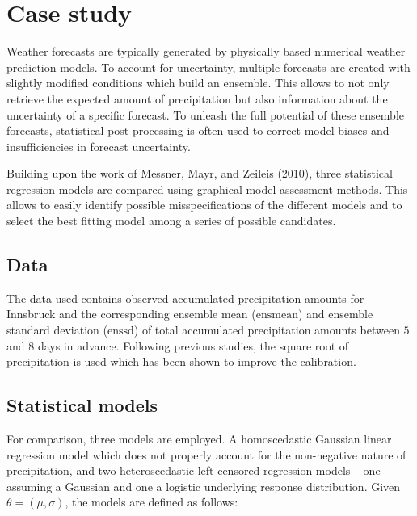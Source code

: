 \documentclass[twoside]{report}
\begin{document}

\maketitle



\section{Case study}

Weather forecasts are typically generated by physically based numerical weather
prediction models. To account for uncertainty, multiple forecasts are created
with slightly modified conditions which build an ensemble.
This allows to not only retrieve the expected amount of precipitation
but also information about the uncertainty of a specific forecast.
To unleash the full potential of these ensemble forecasts, statistical
post-processing is often used to correct model biases and insufficiencies in
forecast uncertainty.

Building upon the work of Messner, Mayr, and Zeileis (2010), three statistical
regression models are compared using graphical model assessment methods.
This allows to easily identify possible misspecifications of the different
models and to select the best fitting model among a series of possible candidates.

\subsection{Data}

The data used contains observed accumulated precipitation amounts for
Innsbruck and the corresponding ensemble mean ($\text{ensmean}$) and
ensemble standard deviation ($\text{enssd}$) of total accumulated precipitation amounts
between $5$ and $8$ days in advance.
Following previous studies, the square root of precipitation is used which has
been shown to improve the calibration.

\subsection{Statistical models}

For comparison, three models are employed. A homoscedastic Gaussian linear regression
model which does not properly account for the non-negative nature of precipitation,
and two heteroscedastic left-censored regression models --
one assuming a Gaussian and one a logistic underlying response distribution.
Given $\theta = (\mu, \sigma)$, the models are defined as follows:
\end{document}
